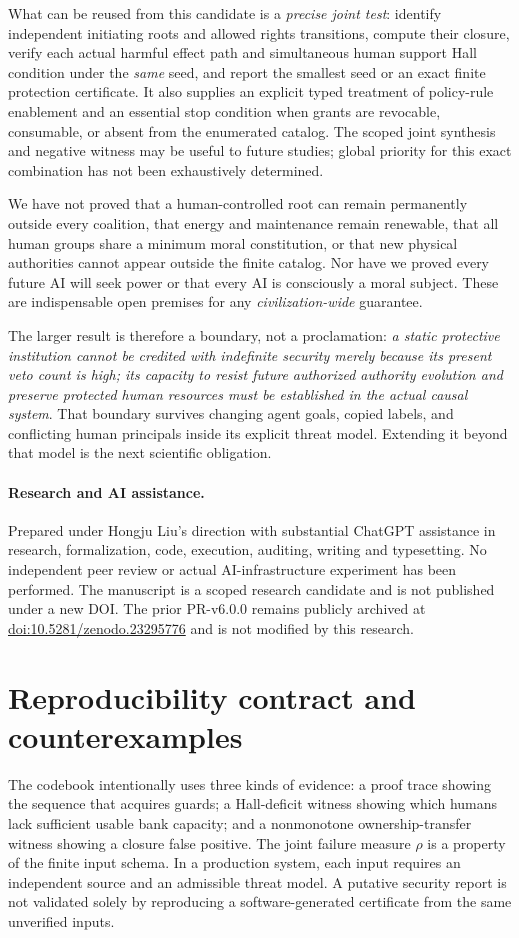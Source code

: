 \documentclass[11pt,a4paper]{article}
\theoremstyle{definition}\newtheorem{definition}{Definition}
\begin{document}
What can be reused from this candidate is a \emph{precise joint test}: identify independent initiating roots and allowed rights transitions, compute their closure, verify each actual harmful effect path and simultaneous human support Hall condition under the \emph{same} seed, and report the smallest seed or an exact finite protection certificate. It also supplies an explicit typed treatment of policy-rule enablement and an essential stop condition when grants are revocable, consumable, or absent from the enumerated catalog. The scoped joint synthesis and negative witness may be useful to future studies; global priority for this exact combination has not been exhaustively determined.

We have not proved that a human-controlled root can remain permanently outside every coalition, that energy and maintenance remain renewable, that all human groups share a minimum moral constitution, or that new physical authorities cannot appear outside the finite catalog. Nor have we proved every future AI will seek power or that every AI is consciously a moral subject. These are indispensable open premises for any \emph{civilization-wide} guarantee.

The larger result is therefore a boundary, not a proclamation: \emph{a static protective institution cannot be credited with indefinite security merely because its present veto count is high; its capacity to resist future authorized authority evolution and preserve protected human resources must be established in the actual causal system}. That boundary survives changing agent goals, copied labels, and conflicting human principals inside its explicit threat model. Extending it beyond that model is the next scientific obligation.

\paragraph{Research and AI assistance.}
Prepared under Hongju Liu's direction with substantial ChatGPT assistance in research, formalization, code, execution, auditing, writing and typesetting. No independent peer review or actual AI-infrastructure experiment has been performed. The manuscript is a scoped research candidate and is not published under a new DOI. The prior PR-v6.0.0 remains publicly archived at \href{https://doi.org/10.5281/zenodo.23295776}{doi:10.5281/zenodo.23295776} and is not modified by this research.

\appendix
\section{Reproducibility contract and counterexamples}
The codebook intentionally uses three kinds of evidence: a proof trace showing the sequence that acquires guards; a Hall-deficit witness showing which humans lack sufficient usable bank capacity; and a nonmonotone ownership-transfer witness showing a closure false positive. The joint failure measure $\rho$ is a property of the finite input schema. In a production system, each input requires an independent source and an admissible threat model. A putative security report is not validated solely by reproducing a software-generated certificate from the same unverified inputs.
\end{document}
